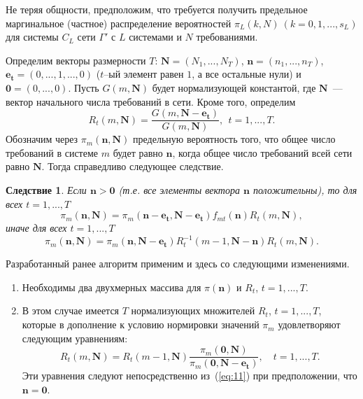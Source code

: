 \documentclass[a4paper,14pt]{extarticle}
\theoremstyle{note}
\newtheorem{corollary}{Следствие}
\begin{document}
Не теряя общности, предположим, что требуется получить предельное маргинальное (частное) распределение вероятностей $\pi_L(k,N)~(k=0,1,...,s_L)$ для системы $C_L$ сети $\Gamma'$ с $L$ системами и $N$ требованиями.

Определим векторы размерности $T$: $\mathbf{N}=(N_1,...,N_T)$, $\mathbf{n}=(n_1,...,n_T)$, $\mathbf{e_t}=(0,...,1,...,0)$ ($t$--ый элемент равен $1$, а все остальные нули) и $\mathbf{0}=(0,...,0)$. Пусть $G(m,\mathbf{N})$ будет нормализующей константой, где $\mathbf{N}$~--- вектор начального числа требований в сети. Кроме того, определим
\begin{equation*}
R_t(m,\mathbf{N}) = \frac{G(m,\mathbf{N}-\mathbf{e_t})}{G(m,\mathbf{N})},~~t=1,...,T.
\end{equation*}
Обозначим через $\pi_m(\mathbf{n},\mathbf{N})$ предельную вероятность того, что общее число требований в системе $m$ будет равно $\mathbf{n}$, когда общее число требований всей сети равно $\mathbf{N}$. Тогда справедливо следующее следствие.

\begin{corollary}
 Если $\mathbf{n} > \mathbf{0}$ (т.е. все элементы вектора $\mathbf{n}$ положительны), то для всех $t=1,...,T$
 \begin{equation}
  \pi_m(\mathbf{n},\mathbf{N}) = \pi_m(\mathbf{n}-\mathbf{e_t},\mathbf{N}-\mathbf{e_t})
  f_{mt}(\mathbf{n}) R_t(m,\mathbf{N}) ,
  \label{eq:10}
 \end{equation}
 иначе для всех $t=1,...,T$
  \begin{equation}
  \pi_m(\mathbf{n},\mathbf{N}) = \pi_m(\mathbf{n},\mathbf{N}-\mathbf{e_t}) R_t^{-1}(m-1,\mathbf{N}-\mathbf{n}) R_t(m,\mathbf{N}) .
  \label{eq:11}
 \end{equation}
\end{corollary}

Разработанный ранее алгоритм применим и здесь со следующими изменениями.
\begin{enumerate}
\item Необходимы два двухмерных массива для $\pi(\mathbf{n})$ и $R_t$, $t=1,...,T$.
\item В этом случае имеется $T$ нормализующих множителей $R_t$, $t=1,...,T$, которые в дополнение к условию нормировки значений $\pi_m$ удовлетворяют следующим уравнениям:
\begin{equation}
 R_t(m,\mathbf{N}) = R_t(m-1,\mathbf{N}) \frac{\pi_m(\mathbf{0},\mathbf{N})}
 {\pi_m(\mathbf{0},\mathbf{N}-\mathbf{e_t})}, \quad t=1,...,T .
 \label{eq:12}
\end{equation}
Эти уравнения следуют непосредственно из~(\ref{eq:11}) при предположении, что $\mathbf{n}=\mathbf{0}$.
\end{enumerate}
\end{document}

